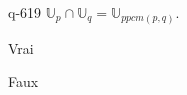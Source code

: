 \begin{truefalse}{q-619}
$\mathbb U_p \cap  \mathbb U_q=\mathbb U_{ppcm(p,q)}$.
\item Vrai
\item* Faux
\end{truefalse}

